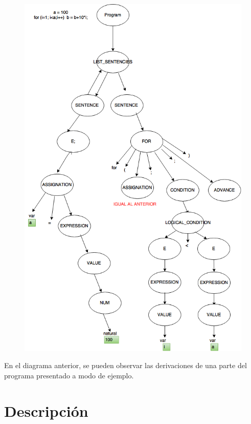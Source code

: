 \documentclass[10pt,a4paper]{article}
\begin{document}
\begin{figure}[H]
\begin{center}
\includegraphics[scale=0.7]{imgs/ejemploGramatica.png}
\end{center}
\end{figure}

En el diagrama anterior, se pueden observar las derivaciones de una parte del programa presentado a modo de ejemplo.

\section{Descripción}
\end{document}

